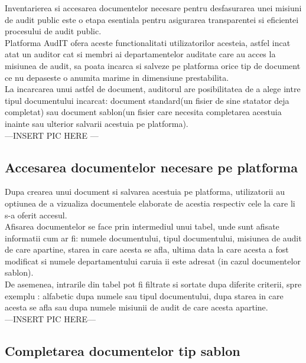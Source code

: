 Inventarierea si accesarea documentelor necesare pentru desfasurarea unei misiuni de audit public este o etapa esentiala pentru asigurarea transparentei si eficientei procesului de audit public.\\
Platforma AudIT ofera aceste functionalitati utilizatorilor acesteia, astfel incat atat un auditor cat si membri ai departamentelor auditate care au acces la misiunea de audit, sa poata incarca si salveze pe platforma orice tip de document ce nu depaseste o anumita marime in dimensiune prestabilita.\\
La incarcarea unui astfel de document, auditorul are posibilitatea de a alege intre tipul documentului incarcat: document standard(un fisier de sine statator deja completat) sau document sablon(un fisier care necesita completarea acestuia inainte sau ulterior salvarii acestuia pe platforma).\\

---INSERT PIC HERE --- \\




 \subsection{Accesarea documentelor necesare pe platforma}
 
 Dupa crearea unui document si salvarea acestuia pe platforma, utilizatorii au optiunea de a vizualiza documentele elaborate de acestia respectiv cele la care li s-a oferit accesul.\\
 Afisarea documentelor se face prin intermediul unui tabel, unde sunt afisate informatii cum ar fi: numele documentului, tipul documentului, misiunea de audit de care apartine, starea in care acesta se afla, ultima data la care acesta a fost modificat si numele departamentului caruia ii este adresat (in cazul documentelor sablon).\\
 De asemenea, intrarile din tabel pot fi filtrate si sortate dupa diferite criterii, spre exemplu : alfabetic dupa numele sau tipul documentului, dupa starea in care acesta se afla sau dupa numele misiunii de audit de care acesta apartine.\\
 
 ---INSERT PIC HERE---\\
 
 
 \subsection{Completarea documentelor tip sablon}
 

